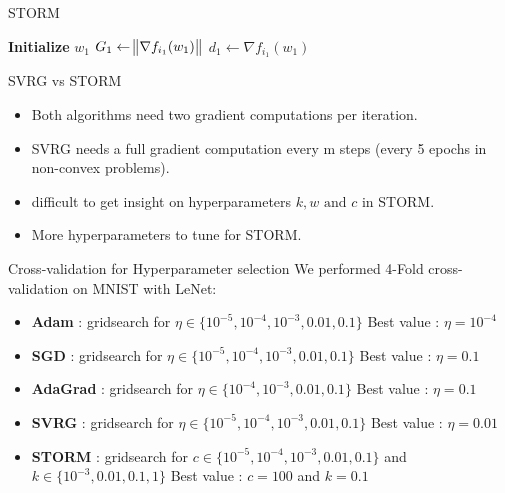 \documentclass[10pt]{beamer}
\begin{document}
\begin{frame}{STORM}
    \begin{algorithm}[H]
        \DontPrintSemicolon
        \SetAlgoNoLine

        \textbf{Initialize} $w_1$\;
        $G_1 \gets \norm {\nabla f_{i_1}(w_1)}$\;
        $d_1 \gets \nabla f_{i_1}(w_1)$\;
        \caption{{\textsc{STORM Procedure}}}
        \label{algo:storm}
    \end{algorithm}
\end{frame}


\begin{frame}{SVRG vs STORM}
\begin{itemize}
    \item Both algorithms need two gradient computations per iteration.
    \item SVRG needs a full gradient computation every m steps (every 5 epochs in non-convex problems).
    \item difficult to get insight on hyperparameters $k,w \text{ and } c$ in STORM.
    \item More hyperparameters to tune for STORM.
\end{itemize}
\end{frame}

\begin{frame}{Cross-validation for Hyperparameter selection}
    We performed 4-Fold cross-validation on MNIST with LeNet:
    \begin{itemize}
        \item \textbf{Adam} : gridsearch for $\eta \in \{10^{-5}, 10^{-4}, 10^{-3}, 0.01, 0.1\}$ \newline
        Best value : $\eta = 10^{-4}$
        \item \textbf{SGD} : gridsearch for $\eta \in \{10^{-5}, 10^{-4}, 10^{-3}, 0.01, 0.1\}$ \newline
        Best value : $\eta = 0.1$
        \item \textbf{AdaGrad} : gridsearch for $\eta \in \{10^{-4}, 10^{-3}, 0.01, 0.1\}$ \newline
        Best value : $\eta = 0.1$
        \item \textbf{SVRG} : gridsearch for $\eta \in \{10^{-5}, 10^{-4}, 10^{-3}, 0.01, 0.1\}$ \newline
        Best value : $\eta = 0.01$
        \item \textbf{STORM} : gridsearch for $c \in \{10^{-5}, 10^{-4}, 10^{-3}, 0.01, 0.1\}$ and $k \in \{10^{-3}, 0.01, 0.1, 1\}$\newline
        Best value : $c = 100$ and $k=0.1$
        
    \end{itemize}
\end{frame}
\end{document}
